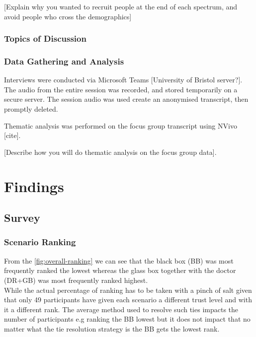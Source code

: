 \documentclass[manuscript,screen,review]{acmart}
\begin{document}
[Explain why you wanted to recruit people at the end of each spectrum, and avoid people who cross the demographics]

\subsubsection{Topics of Discussion}



\subsubsection{Data Gathering and Analysis}
Interviews were conducted via Microsoft Teams [University of Bristol server?]. The audio from the entire session was recorded, and stored temporarily on a secure server. The session audio was used create an anonymised transcript, then promptly deleted. 

Thematic analysis was performed on the focus group transcript using NVivo [cite]. 

[Describe how you will do thematic analysis on the focus group data].









\section{Findings}
\subsection{Survey}
\subsubsection{Scenario Ranking}

From the \ref{fig:overall-ranking} we can see that the black box (BB) was most frequently ranked the lowest whereas the glass box together with the doctor (DR+GB) was most frequently ranked highest.\\

While the actual percentage of ranking has to be taken with a pinch of salt given that only 49 participants have given each scenario a different trust level and with it a different rank. The average method used to resolve such ties impacts the number of participants e.g ranking the BB lowest but it does not impact that no matter what the tie resolution strategy is the BB gets the lowest rank.
\end{document}
